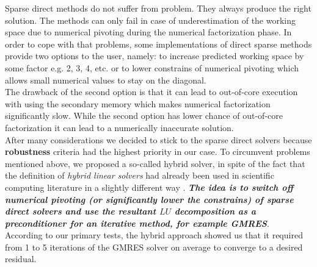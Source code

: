 Sparse direct methods do not suffer from problem. They always produce the right solution. The methods can only fail in case of underestimation of the working space due to numerical pivoting during the numerical factorization phase. In order to cope with that problems, some implementations of direct sparse methods provide two options to the user, namely: to increase predicted working space by some factor e.g. 2, 3, 4, etc. or to lower constrains of numerical pivoting which allows small numerical values to stay on the diagonal.\\


The drawback of the second option is that it can lead to out-of-core execution with using the secondary memory which makes numerical factorization significantly slow. While the second option has lower chance of out-of-core factorization it can lead to a numerically inaccurate solution. \\


 After many considerations we decided to stick to the sparse direct solvers because \textbf{robustness} criteria had the highest priority in our case. To circumvent problems mentioned above, we proposed a so-called hybrid solver, in spite of the fact that the definition of \textit{hybrid linear solvers} had already been used in scientific computing literature in a slightly different way \cite{shylu-hybrid-solver}. \textbf{\textit{The idea is to switch off numerical pivoting (or significantly lower the constrains) of sparse direct solvers and use the resultant $LU$ decomposition as a preconditioner for an iterative method, for example GMRES}}.\\




According to our primary tests, the hybrid approach showed us that it required from 1 to 5 iterations of the GMRES solver on average to converge to a desired residual.\\



